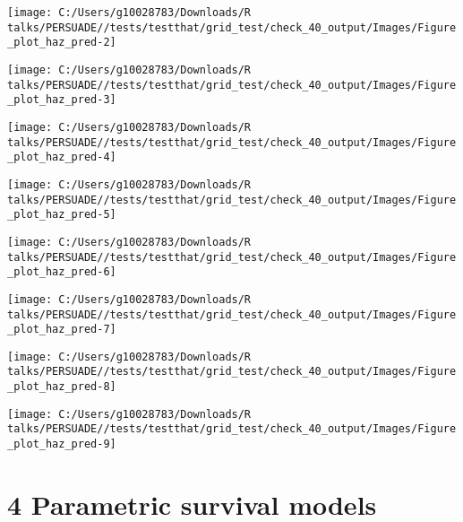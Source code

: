 \documentclass[
]{article}
\begin{document}
\begin{flushleft}\texttt{[image: C:/Users/g10028783/Downloads/R talks/PERSUADE//tests/testthat/grid\_test/check\_40\_output/Images/Figure\_plot\_haz\_pred-2]} \end{flushleft}

\begin{flushleft}\texttt{[image: C:/Users/g10028783/Downloads/R talks/PERSUADE//tests/testthat/grid\_test/check\_40\_output/Images/Figure\_plot\_haz\_pred-3]} \end{flushleft}

\begin{flushleft}\texttt{[image: C:/Users/g10028783/Downloads/R talks/PERSUADE//tests/testthat/grid\_test/check\_40\_output/Images/Figure\_plot\_haz\_pred-4]} \end{flushleft}

\begin{flushleft}\texttt{[image: C:/Users/g10028783/Downloads/R talks/PERSUADE//tests/testthat/grid\_test/check\_40\_output/Images/Figure\_plot\_haz\_pred-5]} \end{flushleft}

\begin{flushleft}\texttt{[image: C:/Users/g10028783/Downloads/R talks/PERSUADE//tests/testthat/grid\_test/check\_40\_output/Images/Figure\_plot\_haz\_pred-6]} \end{flushleft}

\begin{flushleft}\texttt{[image: C:/Users/g10028783/Downloads/R talks/PERSUADE//tests/testthat/grid\_test/check\_40\_output/Images/Figure\_plot\_haz\_pred-7]} \end{flushleft}

\begin{flushleft}\texttt{[image: C:/Users/g10028783/Downloads/R talks/PERSUADE//tests/testthat/grid\_test/check\_40\_output/Images/Figure\_plot\_haz\_pred-8]} \end{flushleft}

\begin{flushleft}\texttt{[image: C:/Users/g10028783/Downloads/R talks/PERSUADE//tests/testthat/grid\_test/check\_40\_output/Images/Figure\_plot\_haz\_pred-9]} \end{flushleft}

\clearpage

\section{4 Parametric survival models}\label{parametric-survival-models}
\end{document}
